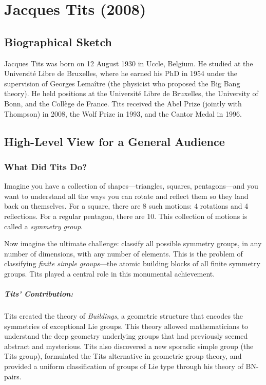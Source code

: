 \chapter{Jacques Tits (2008)}

\section{Biographical Sketch}

Jacques Tits was born on 12 August 1930 in Uccle, Belgium. He studied at the Universit\'e Libre de Bruxelles, where he earned his PhD in 1954 under the supervision of Georges Lema\^itre (the physicist who proposed the Big Bang theory). He held positions at the Universit\'e Libre de Bruxelles, the University of Bonn, and the Coll\`ege de France. Tits received the Abel Prize (jointly with Thompson) in 2008, the Wolf Prize in 1993, and the Cantor Medal in 1996.

\section{High-Level View for a General Audience}

\subsection{What Did Tits Do?}

Imagine you have a collection of shapes---triangles, squares, pentagons---and you want to understand all the ways you can rotate and reflect them so they land back on themselves. For a square, there are 8 such motions: 4 rotations and 4 reflections. For a regular pentagon, there are 10. This collection of motions is called a \emph{symmetry group}.

Now imagine the ultimate challenge: classify all possible symmetry groups, in any number of dimensions, with any number of elements. This is the problem of classifying \emph{finite simple groups}---the atomic building blocks of all finite symmetry groups. Tits played a central role in this monumental achievement.

\paragraph{Tits' Contribution:} Tits created the theory of \emph{Buildings}, a geometric structure that encodes the symmetries of exceptional Lie groups. This theory allowed mathematicians to understand the deep geometry underlying groups that had previously seemed abstract and mysterious. Tits also discovered a new sporadic simple group (the Tits group), formulated the Tits alternative in geometric group theory, and provided a uniform classification of groups of Lie type through his theory of BN-pairs.

